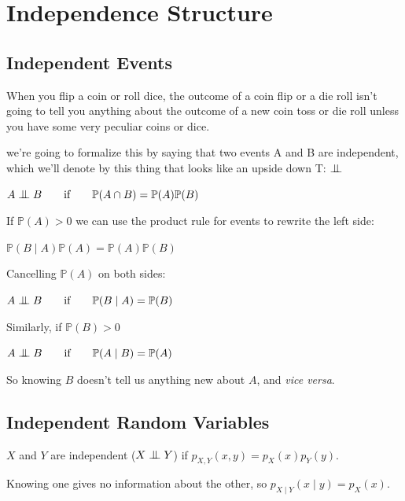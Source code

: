 \documentclass[6008notes.tex]{subfiles}
\begin{document}
\graphicspath{ {images/indepstruct/} }

\section{Independence Structure}

\subsection{Independent Events}

When you flip a coin or roll dice, the outcome of a coin flip or a die roll isn't going to tell you anything about the outcome of a new coin toss or die roll unless you have some very peculiar coins or dice.

we're going to formalize this by saying that two events A and B are independent, which we'll denote by this thing that looks like an upside down T: $\bigCI$

{\centering $A \bigCI B \qquad \text{if} \qquad \mathbb {P}(A \cap B) = \mathbb {P}(A) \mathbb {P}(B)$ \par}

If $\mathbb {P}(A) > 0$ we can use the product rule for events to rewrite the left side:

{\centering $\mathbb {P}(B \mid A) \mathbb {P}(A) = \mathbb {P}(A) \mathbb {P}(B)$ \par}

Cancelling $\mathbb {P}(A)$ on both sides:

{\centering $A \bigCI B \qquad \text{if} \qquad \mathbb {P}(B \mid A) = \mathbb {P}(B)$ \par}

Similarly, if $\mathbb {P}(B) > 0$

{\centering $A \bigCI B \qquad \text{if} \qquad \mathbb {P}(A \mid B) = \mathbb {P}(A)$ \par}

So knowing $B$ doesn't tell us anything new about $A$, and \textit{vice versa}.

\subsection{Independent Random Variables}

$X$ and $Y$ are independent ($X \bigCI Y$) if $p_{X,Y} (x,y) = p_X(x)p_Y(y)$.

Knowing one gives no information about the other, so $p_{X \mid Y} (x \mid y) = p_X(x)$.
\end{document}
